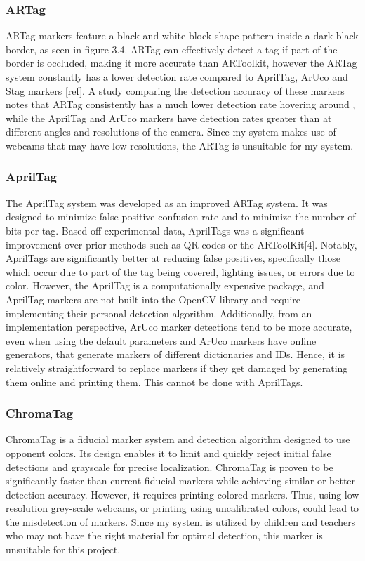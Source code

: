 \documentclass[oneside,%
                    author={Malak Hajji},
                    degree={BSc},
                    title={Designing An Accessible Computational Toolkit For Students},
                  subtitle={With Mixed Visual Abilities}]{dissertation}
\begin{document}
\subsubsection{ARTag}
ARTag markers feature a black and white block shape pattern inside a dark black border, as seen in figure 3.4. ARTag can  effectively detect a tag if part of the border is occluded, making it more accurate than ARToolkit, however the ARTag system constantly has a lower detection rate compared to AprilTag, ArUco and Stag markers [ref]. A study comparing the detection accuracy of these markers notes that ARTag consistently has a much lower detection rate hovering around , while the AprilTag and ArUco markers have detection rates greater than  at different angles and resolutions of the camera. Since my system makes use of webcams that may have low resolutions, the ARTag is unsuitable for my system.

\subsubsection{AprilTag}
The AprilTag system was developed as an improved ARTag system. It was designed to minimize false positive confusion rate and to minimize the number of bits per tag.
Based off experimental data, AprilTags was a significant improvement over prior methods such as QR codes or the ARToolKit[4]. Notably, AprilTags are significantly better at reducing false positives, specifically those which occur due to part of the tag being covered, lighting issues, or errors due to color. However, the AprilTag is a computationally expensive package, and AprilTag markers are not built into the OpenCV library and require implementing their personal detection algorithm. Additionally, from an implementation perspective, ArUco marker detections tend to be more accurate, even when using the default parameters and ArUco markers have online generators, that generate markers of different dictionaries and IDs. Hence, it is relatively straightforward to replace markers if they get damaged by generating them online and printing them. This cannot be done with AprilTags.

\subsubsection{ChromaTag}
ChromaTag is a fiducial marker system and detection algorithm designed to use opponent colors. Its design enables it to limit and quickly reject initial false detections and grayscale for precise localization. ChromaTag is proven to be significantly faster than current fiducial markers while achieving similar or better detection accuracy. However, it requires printing colored markers. Thus, using low resolution grey-scale webcams, or printing using uncalibrated colors, could lead to the misdetection of markers. Since my system is utilized by children and teachers who may not have the right material for optimal detection, this marker is unsuitable for this project. 
\end{document}
